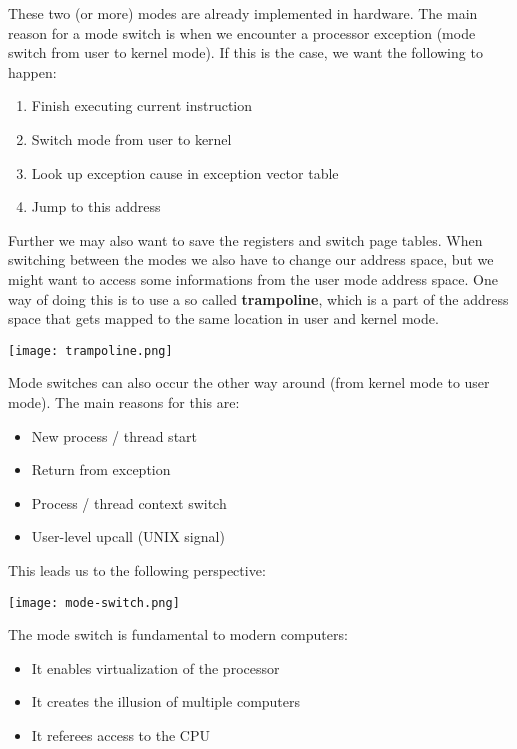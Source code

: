 These two (or more) modes are already implemented in hardware. The main reason for a mode switch is when we encounter a processor exception (mode switch from user to kernel mode). If this is the case, we want the following to happen:

\begin{enumerate}
	\item Finish executing current instruction
	\item Switch mode from user to kernel
	\item Look up exception cause in exception vector table
	\item Jump to this address
\end{enumerate}

Further we may also want to save the registers and switch page tables. When switching between the modes we also have to change our address space, but we might want to access some informations from the user mode address space. One way of doing this is to use a so called \textbf{trampoline}, which is a part of the address space that gets mapped to the same location in user and kernel mode.

\begin{center}
	\texttt{[image: trampoline.png]}
\end{center}

Mode switches can also occur the other way around (from kernel mode to user mode). The main reasons for this are:

\begin{itemize}
	\item New process / thread start
	\item Return from exception
	\item Process / thread context switch
	\item User-level upcall (UNIX signal)
\end{itemize}

This leads us to the following perspective:

\begin{center}
	\texttt{[image: mode-switch.png]}
\end{center}

The mode switch is fundamental to modern computers:

\begin{itemize}
	\item It enables virtualization of the processor
	\item It creates the illusion of multiple computers
	\item It referees access to the CPU
\end{itemize}


